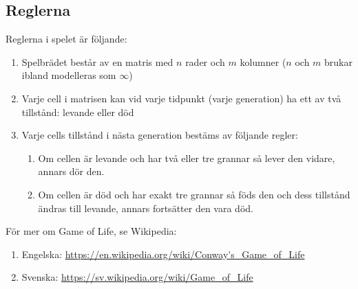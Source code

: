 


\subsection{Reglerna}

Reglerna i spelet är följande:

\begin{enumerate}
    \item Spelbrädet består av en matris med $n$ rader och $m$ kolumner ($n$ och $m$ brukar ibland modelleras som $\infty$)
    \item Varje cell i matrisen kan vid varje tidpunkt (varje generation) ha ett av två tillstånd: levande eller död
    \item Varje cells tillstånd i nästa generation bestäms av följande regler:
        \begin{enumerate}
            \item Om cellen är levande och har två eller tre grannar så lever den vidare, annars dör den.
            \item Om cellen är död och har exakt tre grannar så föds den och dess tillstånd ändras till levande, annars fortsätter den vara död.
        \end{enumerate}
\end{enumerate}


För mer om Game of Life, se Wikipedia:

\begin{enumerate}
    \item Engelska: \url{https://en.wikipedia.org/wiki/Conway's_Game_of_Life}
    \item Svenska: \url{https://sv.wikipedia.org/wiki/Game_of_Life}
\end{enumerate}



